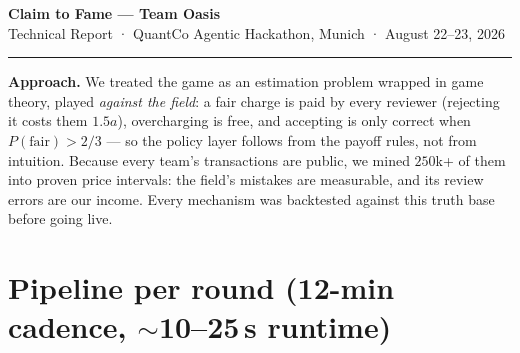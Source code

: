 \documentclass[10pt,a4paper]{article}
\begin{document}
\begin{center}
  {\LARGE\bfseries Claim to Fame --- Team Oasis}\\[2pt]
  {\small Technical Report \;·\; QuantCo Agentic Hackathon, Munich \;·\; August 22--23, 2026}
\end{center}
\vspace{-2pt}\hrule\vspace{5pt}

\textbf{Approach.} We treated the game as an estimation problem wrapped in game theory,
played \emph{against the field}: a fair charge is paid by every reviewer (rejecting it
costs them $1.5a$), overcharging is free, and accepting is only correct when
$P(\mathrm{fair}) > 2/3$ --- so the policy layer follows from the payoff rules, not from
intuition. Because every team's transactions are public, we mined $250$k+ of them into
proven price intervals: the field's mistakes are measurable, and its review errors are
our income. Every mechanism was backtested against this truth base before going live.

\section*{Pipeline per round (12-min cadence, $\sim$10--25\,s runtime)}
\vspace{-4pt}
\begin{center}
\end{center}
\end{document}
